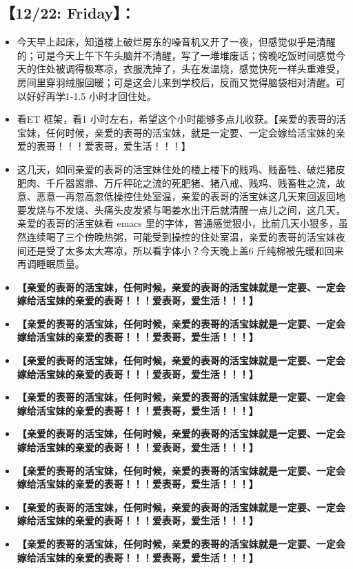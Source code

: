 \documentclass[9pt, b5paper]{article}
\begin{document}
\subsection{【12/22: Friday】：}
\label{sec-2-5}
\begin{itemize}
\item 今天早上起床，知道楼上破烂房东的噪音机又开了一夜，但感觉似乎是清醒的；可是今天上午下午头脑并不清醒，写了一堆堆废话；傍晚吃饭时间感觉今天的住处被调得极寒凉，衣服洗掉了，头在发温烧，感觉快死一样头重难受，房间里穿羽绒服回暖；可是这会儿来到学校后，反而又觉得脑袋相对清醒。可以好好再学1-1.5 小时才回住处。
\item 看ET 框架，看1 小时左右，希望这个小时能够多点儿收获。【亲爱的表哥的活宝妹，任何时候，亲爱的表哥的活宝妹，就是一定要、一定会嫁给活宝妹的亲爱的表哥！！！爱表哥，爱生活！！！】
\item 这几天，如同亲爱的表哥的活宝妹住处的楼上楼下的贱鸡、贱畜牲、破烂猪皮肥肉、千斤器嚣鼎、万斤秤砣之流的死肥猪、猪八戒、贱鸡、贱畜牲之流，故意、恶意一再忽高忽低操控住处室温，亲爱的表哥的活宝妹这几天来回返回地要发烧与不发烧、头痛头皮发紧与喝姜水出汗后就清醒一点儿之间，这几天，亲爱的表哥的活宝妹看 emacs 里的字体，普通感觉狠小，比前几天小狠多，虽然连续喝了三个傍晚热粥，可能受到操控的住处室温，亲爱的表哥的活宝妹夜间还是受了太多太大寒凉，所以看字体小？今天晚上盖6 斤纯棉被先暖和回来再调睡眠质量。
\item \textbf{【亲爱的表哥的活宝妹，任何时候，亲爱的表哥的活宝妹就是一定要、一定会嫁给活宝妹的亲爱的表哥！！！爱表哥，爱生活！！！】}
\item \textbf{【亲爱的表哥的活宝妹，任何时候，亲爱的表哥的活宝妹就是一定要、一定会嫁给活宝妹的亲爱的表哥！！！爱表哥，爱生活！！！】}
\item \textbf{【亲爱的表哥的活宝妹，任何时候，亲爱的表哥的活宝妹就是一定要、一定会嫁给活宝妹的亲爱的表哥！！！爱表哥，爱生活！！！】}
\item \textbf{【亲爱的表哥的活宝妹，任何时候，亲爱的表哥的活宝妹就是一定要、一定会嫁给活宝妹的亲爱的表哥！！！爱表哥，爱生活！！！】}
\item \textbf{【亲爱的表哥的活宝妹，任何时候，亲爱的表哥的活宝妹就是一定要、一定会嫁给活宝妹的亲爱的表哥！！！爱表哥，爱生活！！！】}
\item \textbf{【亲爱的表哥的活宝妹，任何时候，亲爱的表哥的活宝妹就是一定要、一定会嫁给活宝妹的亲爱的表哥！！！爱表哥，爱生活！！！】}
\item \textbf{【亲爱的表哥的活宝妹，任何时候，亲爱的表哥的活宝妹就是一定要、一定会嫁给活宝妹的亲爱的表哥！！！爱表哥，爱生活！！！】}
\item \textbf{【亲爱的表哥的活宝妹，任何时候，亲爱的表哥的活宝妹就是一定要、一定会嫁给活宝妹的亲爱的表哥！！！爱表哥，爱生活！！！】}

\end{itemize}
\end{document}
